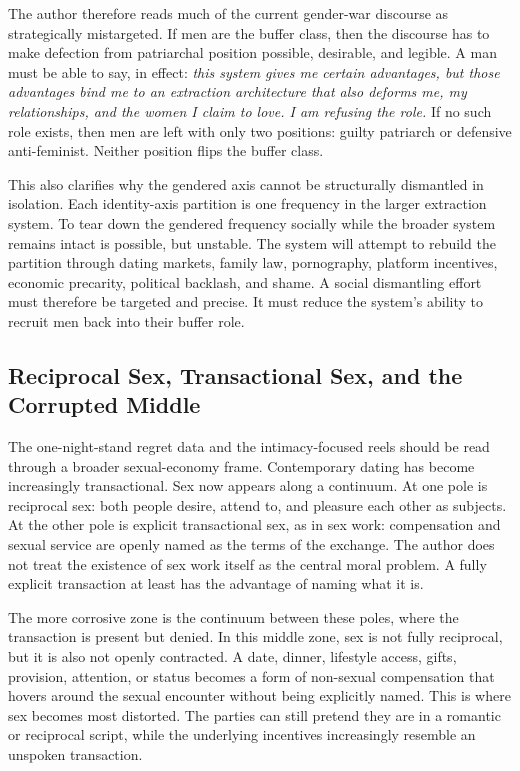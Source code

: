 \documentclass[12pt]{article}
\begin{document}
The author therefore reads much of the current gender-war discourse as strategically mistargeted. If men are the buffer class, then the discourse has to make defection from patriarchal position possible, desirable, and legible. A man must be able to say, in effect: \textit{this system gives me certain advantages, but those advantages bind me to an extraction architecture that also deforms me, my relationships, and the women I claim to love. I am refusing the role.} If no such role exists, then men are left with only two positions: guilty patriarch or defensive anti-feminist. Neither position flips the buffer class.

This also clarifies why the gendered axis cannot be structurally dismantled in isolation. Each identity-axis partition is one frequency in the larger extraction system. To tear down the gendered frequency socially while the broader system remains intact is possible, but unstable. The system will attempt to rebuild the partition through dating markets, family law, pornography, platform incentives, economic precarity, political backlash, and shame. A social dismantling effort must therefore be targeted and precise. It must reduce the system's ability to recruit men back into their buffer role.

\subsection{Reciprocal Sex, Transactional Sex, and the Corrupted Middle}

The one-night-stand regret data and the intimacy-focused reels should be read through a broader sexual-economy frame. Contemporary dating has become increasingly transactional. Sex now appears along a continuum. At one pole is reciprocal sex: both people desire, attend to, and pleasure each other as subjects. At the other pole is explicit transactional sex, as in sex work: compensation and sexual service are openly named as the terms of the exchange. The author does not treat the existence of sex work itself as the central moral problem. A fully explicit transaction at least has the advantage of naming what it is.

The more corrosive zone is the continuum between these poles, where the transaction is present but denied. In this middle zone, sex is not fully reciprocal, but it is also not openly contracted. A date, dinner, lifestyle access, gifts, provision, attention, or status becomes a form of non-sexual compensation that hovers around the sexual encounter without being explicitly named. This is where sex becomes most distorted. The parties can still pretend they are in a romantic or reciprocal script, while the underlying incentives increasingly resemble an unspoken transaction.
\end{document}
